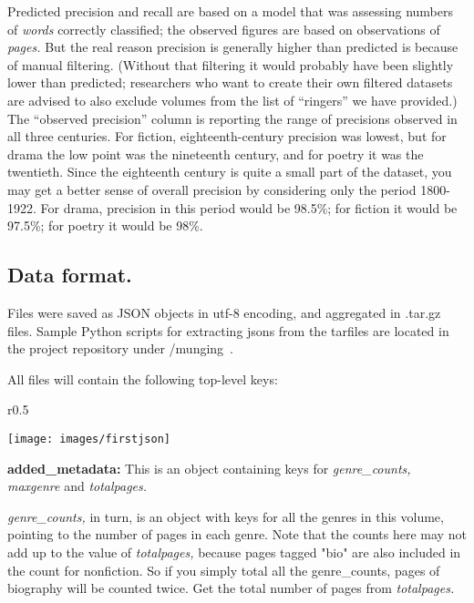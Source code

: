\documentclass[paper=a4, fontsize=12pt]{scrartcl}
\numberwithin{equation}{section}		%
\numberwithin{figure}{section}			%
\numberwithin{table}{section}				%
\begin{document}
Predicted precision and recall are based on a model that was assessing numbers of \textit{words} correctly classified; the observed figures are based on observations of \textit{pages.} But the real reason precision is generally higher than predicted is because of manual filtering. (Without that filtering it would probably have been slightly lower than predicted; researchers who want to create their own filtered datasets are advised to also exclude volumes from the list of ``ringers'' we have provided.) The ``observed precision'' column is reporting the range of precisions observed in all three centuries. For fiction, eighteenth-century precision was lowest, but for drama the low point was the nineteenth century, and for poetry it was the twentieth. Since the eighteenth century is quite a small part of the dataset, you may get a better sense of overall precision by considering only the period 1800-1922. For drama, precision in this period would be 98.5\%; for fiction it would be 97.5\%; for poetry it would be 98\%.

\newpage
\subsection{Data format.}

Files were saved as JSON objects in utf-8 encoding, and aggregated in .tar.gz files. Sample Python scripts for extracting jsons from the tarfiles are located in the project repository under /munging~\cite{underwood:genrerepo}.

\vspace{2mm}
\noindent All files will contain the following top-level keys:

\begin{wrapfigure}[19]{r}{0.5\textwidth}
  \begin{centering}
    \texttt{[image: images/firstjson]}
  \end{centering}
\end{wrapfigure}

\vspace{2mm}
\noindent \textbf{added\_metadata:} This is an object containing keys for \textit{genre\_counts, maxgenre} and \textit{totalpages.}

\textit{genre\_counts,} in turn, is an object with keys for all the genres in this volume, pointing to the number of pages in each genre. Note that the counts here may not add up to the value of \textit{totalpages,} because pages tagged "bio" are also included in the count for nonfiction. So if you simply total all the genre\_counts, pages of biography will be counted twice. Get the total number of pages from \textit{totalpages.}
\end{document}
